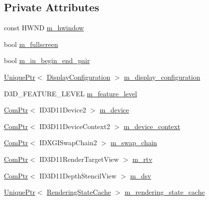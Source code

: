 \subsection*{Private Attributes}
\begin{DoxyCompactItemize}
\item 
const H\+W\+ND \hyperlink{classmage_1_1_renderer_adadc1028e5ad6551abbecfd8529e4aa1}{m\+\_\+hwindow}
\item 
bool \hyperlink{classmage_1_1_renderer_a72bb88b17491bd388460afae9d207b0a}{m\+\_\+fullscreen}
\item 
bool \hyperlink{classmage_1_1_renderer_a3caa1bad6cbfde8f87f807e5c97924e3}{m\+\_\+in\+\_\+begin\+\_\+end\+\_\+pair}
\item 
\hyperlink{namespacemage_a3316d7143a973e37adf1110f2e80ca31}{Unique\+Ptr}$<$ \hyperlink{structmage_1_1_display_configuration}{Display\+Configuration} $>$ \hyperlink{classmage_1_1_renderer_ab5638066fba5a0b9ce307f7db3ba5433}{m\+\_\+display\+\_\+configuration}
\item 
D3\+D\+\_\+\+F\+E\+A\+T\+U\+R\+E\+\_\+\+L\+E\+V\+EL \hyperlink{classmage_1_1_renderer_aa97b108ef58f7d41ddb527f6ba2bfdf9}{m\+\_\+feature\+\_\+level}
\item 
\hyperlink{namespacemage_ae74f374780900893caa5555d1031fd79}{Com\+Ptr}$<$ I\+D3\+D11\+Device2 $>$ \hyperlink{classmage_1_1_renderer_aecf4bcb70dc186b4f2083df38d1e4bc3}{m\+\_\+device}
\item 
\hyperlink{namespacemage_ae74f374780900893caa5555d1031fd79}{Com\+Ptr}$<$ I\+D3\+D11\+Device\+Context2 $>$ \hyperlink{classmage_1_1_renderer_a47c4a1d46e84bbdc3ec876809633877e}{m\+\_\+device\+\_\+context}
\item 
\hyperlink{namespacemage_ae74f374780900893caa5555d1031fd79}{Com\+Ptr}$<$ I\+D\+X\+G\+I\+Swap\+Chain2 $>$ \hyperlink{classmage_1_1_renderer_a5419a7a11e8f0f69e92dd6a5cb9bd217}{m\+\_\+swap\+\_\+chain}
\item 
\hyperlink{namespacemage_ae74f374780900893caa5555d1031fd79}{Com\+Ptr}$<$ I\+D3\+D11\+Render\+Target\+View $>$ \hyperlink{classmage_1_1_renderer_a86ed436120830cef3e0173f85550aa50}{m\+\_\+rtv}
\item 
\hyperlink{namespacemage_ae74f374780900893caa5555d1031fd79}{Com\+Ptr}$<$ I\+D3\+D11\+Depth\+Stencil\+View $>$ \hyperlink{classmage_1_1_renderer_a27a62437e26957890563a68ebcde1909}{m\+\_\+dsv}
\item 
\hyperlink{namespacemage_a3316d7143a973e37adf1110f2e80ca31}{Unique\+Ptr}$<$ \hyperlink{structmage_1_1_rendering_state_cache}{Rendering\+State\+Cache} $>$ \hyperlink{classmage_1_1_renderer_a3d9f823ecef314a974c4cdb3a71a1853}{m\+\_\+rendering\+\_\+state\+\_\+cache}
\end{DoxyCompactItemize}


